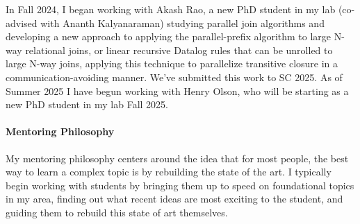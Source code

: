 \documentclass[12pt]{article}
\begin{document}
In Fall 2024, I began working with Akash Rao, a new PhD student in my lab (co-advised with Ananth Kalyanaraman) studying parallel join algorithms and developing a new approach to applying the parallel-prefix algorithm to large N-way relational joins, or linear recursive Datalog rules that can be unrolled to large N-way joins, applying this technique to parallelize transitive closure in a communication-avoiding manner. We've submitted this work to SC 2025. As of Summer 2025 I have begun working with Henry Olson, who will be starting as a new PhD student in my lab Fall 2025.  



\paragraph{Mentoring Philosophy}

My mentoring philosophy centers around the idea that for most people, the best way to learn a complex topic is by rebuilding the state of the art. I typically begin working with students by bringing them up to speed on foundational topics in my area, finding out what recent ideas are most exciting to the student, and guiding them to rebuild this state of art themselves.

\end{document}
